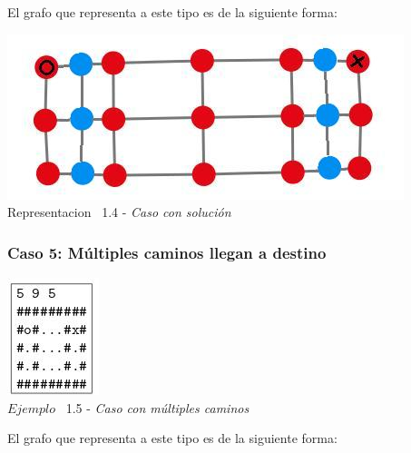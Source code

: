 El grafo que representa a este tipo es de la siguiente forma:\\

\vspace*{0.3cm} \vspace*{0.3cm}
  \begin{center}
 \includegraphics[scale=0.5]{./EJ1/ej1graforandom.jpeg}
 \\{Representacion \ 1.4 - \textit{Caso con solución}}
  \end{center}
  \vspace*{0.3cm}

\begin{center}
  \subsubsection*{Caso 5: M\'ultiples caminos llegan a destino}
\end{center}

\vspace*{0.3cm} \vspace*{0.3cm}
  \begin{center}
 \includegraphics[scale=1.6]{./EJ1/ej1random.jpeg}
\\ {$Ejemplo$ \ 1.5 - \textit{Caso con m\'ultiples caminos}}
  \end{center}
  \vspace*{0.3cm}

El grafo que representa a este tipo es de la siguiente forma:\\

